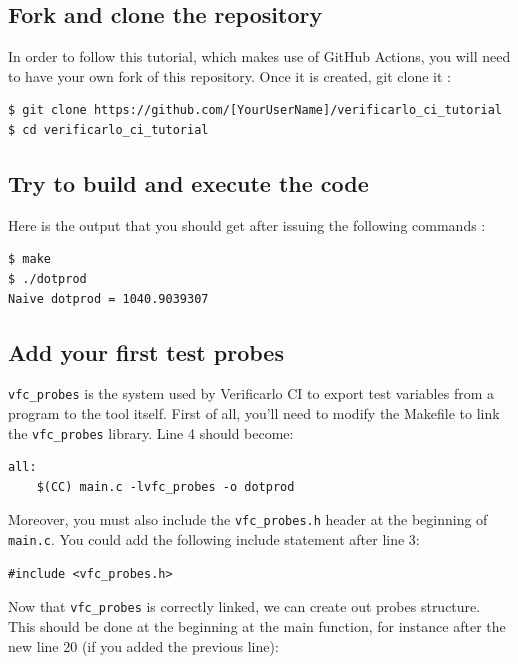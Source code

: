 \subsection{Fork and clone the repository}

In order to follow this tutorial, which makes use of GitHub Actions, you will
need to have your own fork of this repository. Once it is created, git clone it
:

\bigbreak

\begin{verbatim}
$ git clone https://github.com/[YourUserName]/verificarlo_ci_tutorial
$ cd verificarlo_ci_tutorial
\end{verbatim}

\subsection{Try to build and execute the code}

Here is the output that you should get after issuing the following commands :

\bigbreak

\begin{verbatim}
$ make
$ ./dotprod
Naive dotprod = 1040.9039307
\end{verbatim}

\subsection{Add your first test probes}

\texttt{vfc_probes} is the system used by Verificarlo CI to export test variables from a program to the tool itself. First of all, you'll need to modify the Makefile to link the \texttt{vfc_probes} library. Line 4 should become:

\bigbreak

\begin{verbatim}
all:
	$(CC) main.c -lvfc_probes -o dotprod
\end{verbatim}

Moreover, you must also include the \texttt{vfc_probes.h} header at the beginning of \texttt{main.c}. You could add the following include statement after line 3:

\bigbreak

\begin{verbatim}
#include <vfc_probes.h>
\end{verbatim}

Now that \texttt{vfc_probes} is correctly linked, we can create out probes structure. This should be done at the beginning at the main function, for instance after the new line 20 (if you added the previous line):

